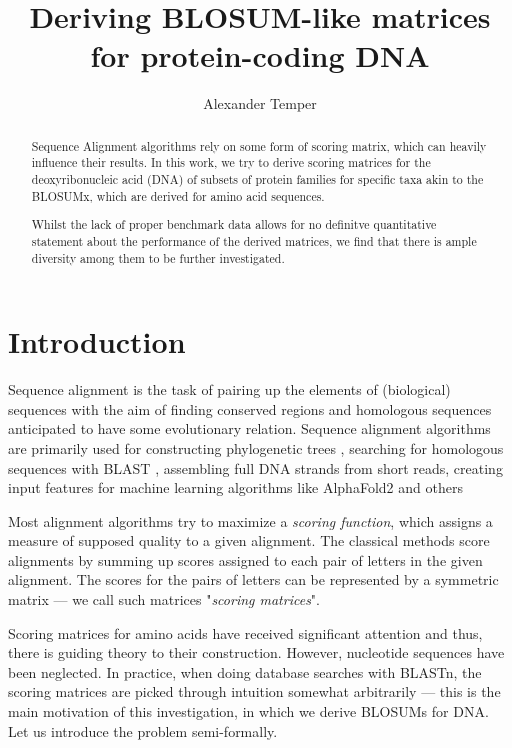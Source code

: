 \documentclass{article}
\title{Deriving BLOSUM-like matrices for protein-coding DNA}
\author{Alexander Temper}
\begin{document}
\maketitle

\begin{abstract}
    Sequence Alignment algorithms rely on some form of scoring matrix,
    which can heavily influence their results. In this work, we try to derive
    scoring matrices for the deoxyribonucleic acid (DNA) of subsets of protein
    families for specific taxa akin to
    the BLOSUMx, which are derived for amino acid sequences.

    Whilst the lack of proper benchmark data allows for no definitve quantitative
    statement about the performance of the derived matrices, we find that there is ample diversity among them to be further investigated.
\end{abstract}

\tableofcontents

\section{Introduction} Sequence alignment is the task of pairing up the
elements of (biological) sequences with the aim of finding conserved
regions and homologous sequences anticipated to have some
evolutionary relation. Sequence alignment algorithms are primarily used for
constructing phylogenetic trees \cite{chatzouMultipleSequenceAlignment2016}, searching for homologous sequences with BLAST \cite{altschulBasicLocalAlignment1990},
assembling full DNA strands from short reads, creating input features for
machine learning algorithms like AlphaFold2 \cite{jumperHighlyAccurateProtein2021a} and others \cite{chatzouMultipleSequenceAlignment2016}

Most alignment algorithms try to maximize a \emph{scoring function},
which assigns a measure of supposed quality to a given alignment.
The classical methods score
alignments by summing up scores assigned to each pair of letters in the given
alignment. The scores for the pairs of letters can be represented by a
symmetric matrix --- we call such matrices "\emph{scoring matrices}".

Scoring matrices for amino acids have received significant attention and thus,
there is guiding theory to their construction. However, 
nucleotide sequences have been neglected. In practice, when doing database searches
with BLASTn, the scoring matrices are picked through intuition somewhat arbitrarily
--- this is the main motivation of this investigation, in which we derive BLOSUMs 
for DNA. Let us introduce the problem semi-formally.
\end{document}
